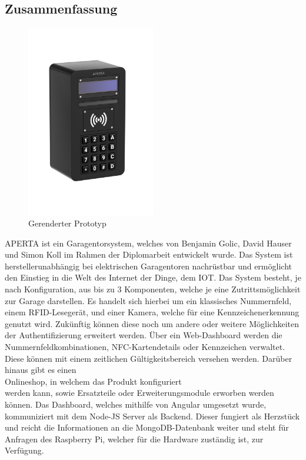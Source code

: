 \newpage
\begin{spacing}{1}
  \chapter*{Zusammenfassung}
\end{spacing}
\begin{figure}
  \begin{center}
    \includegraphics[width=0.5\textwidth]{pics/all-in-package.png}
    \caption{Gerenderter Prototyp}
  \end{center}
\end{figure}
APERTA ist ein Garagentorsystem, welches von Benjamin Golic, David Hauser und Simon Koll im Rahmen der Diplomarbeit entwickelt wurde. Das System ist herstellerunabhängig bei elektrischen Garagentoren nachrüstbar und ermöglicht den Einstieg in die Welt des Internet der Dinge, dem IOT. Das System besteht, je nach Konfiguration, aus bis zu 3 Komponenten, welche je eine Zutrittsmöglichkeit zur Garage darstellen. Es handelt sich hierbei um ein klassisches Nummernfeld, einem RFID-Lesegerät, und einer Kamera, welche für eine Kennzeichenerkennung genutzt wird. Zukünftig können diese noch um andere oder weitere Möglichkeiten der Authentifizierung erweitert werden. Über ein Web-Dashboard werden die Nummernfeldkombinationen, NFC-Kartendetails oder Kennzeichen verwaltet. Diese können mit einem zeitlichen Gültigkeitsbereich versehen werden. Darüber hinaus gibt es einen \\ Onlineshop, in welchem das Produkt konfiguriert \\ werden kann, sowie Ersatzteile oder Erweiterungsmodule erworben werden können. Das Dashboard, welches mithilfe von Angular umgesetzt wurde, kommuniziert mit dem Node-JS Server als Backend. Dieser fungiert als Herzstück und reicht die Informationen an die MongoDB-Datenbank weiter und steht für Anfragen des Raspberry Pi, welcher für die Hardware zuständig ist, zur Verfügung.